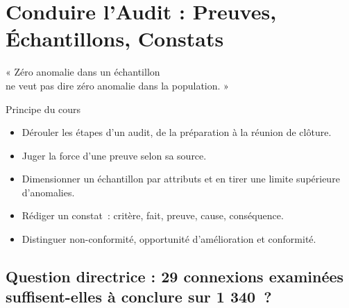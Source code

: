 
\chapter{Conduire l'Audit : Preuves, Échantillons, Constats}
\label{chap:conduire}

\epigraph{%
    « Zéro anomalie dans un échantillon\\
    ne veut pas dire zéro anomalie dans la population. »%
}{Principe du cours}


\begin{boxobjectifs}
\begin{itemize}
    \item Dérouler les étapes d'un audit, de la préparation à la réunion de
          clôture.
    \item Juger la force d'une preuve selon sa source.
    \item Dimensionner un échantillon par attributs et en tirer une limite
          supérieure d'anomalies.
    \item Rédiger un constat~: critère, fait, preuve, cause, conséquence.
    \item Distinguer non-conformité, opportunité d'amélioration et
          conformité.
\end{itemize}
\end{boxobjectifs}

\bigskip

\section*{Question directrice : 29 connexions examinées suffisent-elles à conclure sur 1 340~?}

